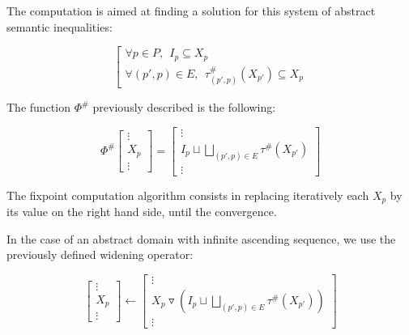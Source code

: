 \documentclass[a4paper,english,titlepage,11pt]{report}
\newcommand*\system[1]{\left[ \begin{array}{lllll}#1 \end{array}\right.}
\newcommand{\widening}{\mathop{\triangledown}}
\begin{document}
The computation is aimed at finding a solution for this system of abstract semantic
inequalities:

$$\system{
\forall p \in P, \ \ I_p \subseteq X_p \\
\forall (p',p) \in E,\ \  \tau^\#_{(p',p)}(X_{p'}) \subseteq X_p
}$$

\begin{figure}[h!]
\centering
{}
\end{figure}

The function $\Phi^\#$ previously described is the following:

$$\Phi^\#\left[ \begin{array}{c}
\vdots \\
X_p \\
\vdots
\end{array} \right] = \left[ \begin{array}{c} 
\vdots \\
I_p \sqcup \displaystyle \bigsqcup_{(p',p) \in E} \tau^\# (X_{p'}) \\
\vdots
\end{array} \right]$$

The fixpoint computation algorithm consists in replacing iteratively each $X_p$ by its value
on the right hand side, until the convergence.

In the case of an abstract domain with infinite ascending sequence, we use the
previously defined widening operator:

$$\left[ \begin{array}{c}
\vdots \\
X_p \\
\vdots
\end{array} \right] \longleftarrow \left[ \begin{array}{c} 
\vdots \\
X_p \widening \left( I_p \sqcup \displaystyle \bigsqcup_{(p',p) \in E} \tau^\#
(X_{p'}) \right) \\
\vdots
\end{array} \right]$$
\end{document}
